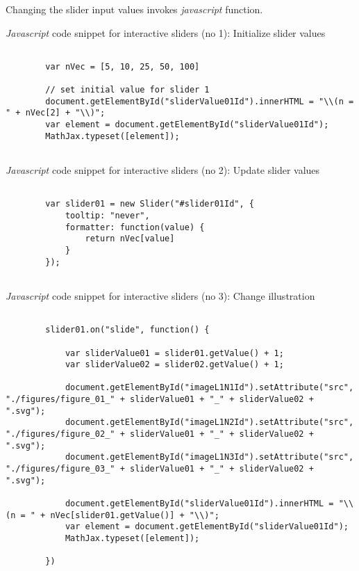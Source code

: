 \documentclass{article}
\begin{document}
Changing the slider input values invokes \emph{javascript} function. 

\begin{CodeSnippet}[!hp]
	\centering
	\caption{\emph{Javascript} code snippet for interactive sliders (no 1): Initialize slider values}
	\normalsize
	\vspace{0.25cm}
	\begin{BVerbatim}
		
		var nVec = [5, 10, 25, 50, 100]
		
		// set initial value for slider 1
		document.getElementById("sliderValue01Id").innerHTML = "\\(n = " + nVec[2] + "\\)";
		var element = document.getElementById("sliderValue01Id");
		MathJax.typeset([element]);
		
	\end{BVerbatim}
	\label{JsCodSniSliInt01}
\end{CodeSnippet}

\begin{CodeSnippet}[!hp]
	\centering
	\caption{\emph{Javascript} code snippet for interactive sliders (no 2): Update slider values}
	\normalsize
	\vspace{0.25cm}
	\begin{BVerbatim}
						
		var slider01 = new Slider("#slider01Id", { 
			tooltip: "never",
			formatter: function(value) {
				return nVec[value]
			} 
		});
		
	\end{BVerbatim}
	\label{JsCodSniSliInt02}
\end{CodeSnippet}

\begin{CodeSnippet}[!hp]
	\centering
	\caption{\emph{Javascript} code snippet for interactive sliders (no 3): Change illustration}
	\tiny
	\vspace{0.25cm}
	\begin{BVerbatim}
		
		slider01.on("slide", function() {
			
			var sliderValue01 = slider01.getValue() + 1;
			var sliderValue02 = slider02.getValue() + 1;
			
			document.getElementById("imageL1N1Id").setAttribute("src", "./figures/figure_01_" + sliderValue01 + "_" + sliderValue02 + ".svg");
			document.getElementById("imageL1N2Id").setAttribute("src", "./figures/figure_02_" + sliderValue01 + "_" + sliderValue02 + ".svg");
			document.getElementById("imageL1N3Id").setAttribute("src", "./figures/figure_03_" + sliderValue01 + "_" + sliderValue02 + ".svg");
			
			document.getElementById("sliderValue01Id").innerHTML = "\\(n = " + nVec[slider01.getValue()] + "\\)";
			var element = document.getElementById("sliderValue01Id");
			MathJax.typeset([element]);
			
		})
		
	\end{BVerbatim}
	\label{JsCodSniSliInt03}
\end{CodeSnippet}
\end{document}
